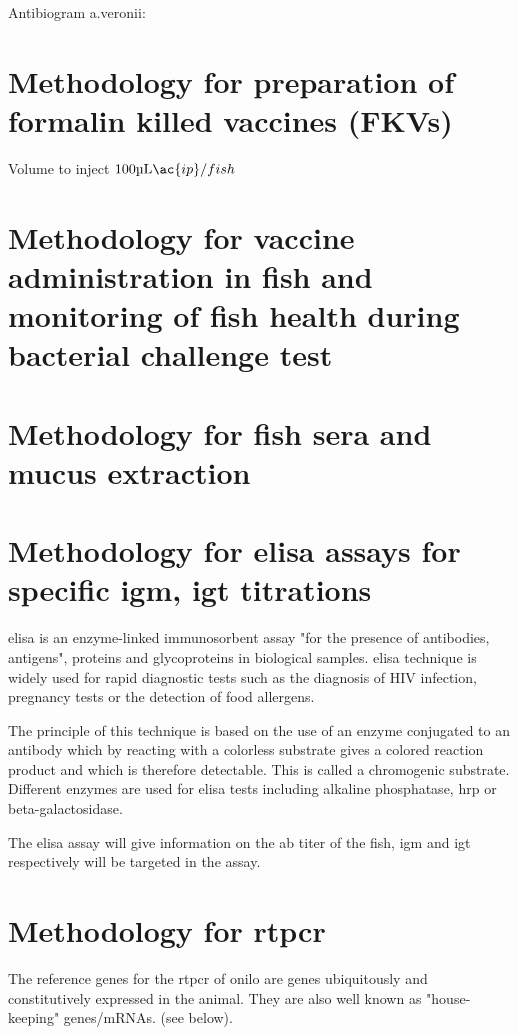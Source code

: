 Antibiogram \ac{a.veronii}: 


\section{Methodology for preparation of formalin killed vaccines (FKVs)}

Volume to inject  ${100\si{\micro\liter}\ac{ip} / fish}$

\section{Methodology for vaccine administration in fish and monitoring of fish health during bacterial challenge test}

\section{Methodology for fish sera and mucus extraction}

\section{Methodology for \ac{elisa} assays for specific \ac{igm}, \ac{igt} titrations}

\ac{elisa} is an enzyme-linked immunosorbent assay "for the presence of antibodies, antigens", proteins and glycoproteins in biological samples. \ac{elisa} technique is widely used for rapid diagnostic tests such as the diagnosis of HIV infection, pregnancy tests or the detection of food allergens.

The principle of this technique is based on the use of an enzyme conjugated to an antibody which by reacting with a colorless substrate gives a colored reaction product and which is therefore detectable. This is called a chromogenic substrate. Different enzymes are used for \ac{elisa} tests including alkaline phosphatase, \ac{hrp} or beta-galactosidase.

The \ac{elisa} assay will give information on the \ac{ab} titer of the fish, \ac{igm} and \ac{igt} respectively will be targeted in the assay.

\section{Methodology for \ac{rtpcr}}

The reference genes for the \ac{rtpcr} of \ac{onilo} are genes ubiquitously and constitutively expressed in the animal. They are also well known as "house-keeping" genes/mRNAs. (see below). 

